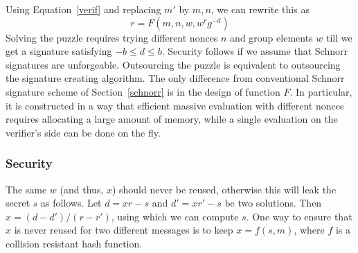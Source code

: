 \documentclass[runningheads]{llncs}
\begin{document}
Using Equation~\ref{verif} and replacing ${m'}$ by $m, n$, we can rewrite this as 
\begin{equation}\label{eqn2}
r = F(m, n,w,w^rg^{-d})
\end{equation}
Solving the puzzle requires trying different nonces $n$ and group elements $w$ till we get a signature satisfying $-b\leq d \leq b$. 
Security follows if we assume that Schnorr signatures are unforgeable. Outsourcing the puzzle is equivalent to outsourcing the signature creating algorithm. The only difference from conventional Schnorr signature scheme of Section~\ref{schnorr} is in the design of function $F$. In particular, it is constructed in a way that efficient massive evaluation with different nonces requires allocating a large amount of memory, while a single evaluation on the verifier's side can be done on the fly.

\subsubsection{Security} 
The same $w$ (and thus, $x$) should never be reused, otherwise this will leak the secret ${s}$ as follows. Let $d = xr-{s}$ and $d' = xr'-{s}$ be two solutions. Then $x = (d-d')/(r-r')$, using which we can compute $s$. One way to ensure that $x$ is never reused for two different messages is to keep $x = f(s, m)$, where $f$ is a collision resistant hash function.
\end{document}
